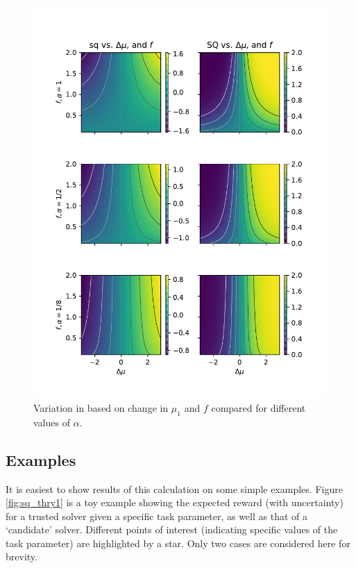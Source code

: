 \begin{figure}[tbp]
    \centering
    \includegraphics[width=0.9\linewidth]{Figures/sq_surf}
    \caption{Variation in \xQ{} based on change in $\mu_1$ and $f$ compared for different values of $\alpha$.}
    \label{fig:sq_surf}
\end{figure}

\subsection{Examples}
It is easiest to show results of this calculation on some simple examples. Figure \ref{fig:sq_thry1} is a toy example showing the expected reward (with uncertainty) for a trusted solver given a specific task parameter, as well as that of a `candidate' solver. Different points of interest (indicating specific values of the task parameter) are highlighted by a star. Only two cases are considered here for brevity.

